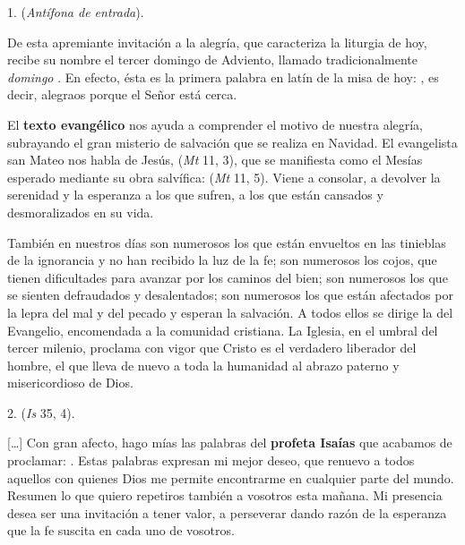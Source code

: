 				\begin{body}
					1.  (\emph{Antífona de entrada}).
					
					De esta apremiante invitación a la alegría, que caracteriza la liturgia de hoy, recibe su nombre el tercer domingo de Adviento, llamado tradicionalmente \emph{domingo }. En efecto, ésta es la primera palabra en latín de la misa de hoy: , es decir, alegraos porque el Señor está cerca.
					
					El \textbf{texto evangélico} nos ayuda a comprender el motivo de nuestra alegría, subrayando el gran misterio de salvación que se realiza en Navidad. El evangelista san Mateo nos habla de Jesús,  (\emph{Mt} 11, 3), que se manifiesta como el Mesías esperado mediante su obra salvífica:  (\emph{Mt} 11, 5). Viene a consolar, a devolver la serenidad y la esperanza a los que sufren, a los que están cansados y desmoralizados en su vida.
					
					También en nuestros días son numerosos los que están envueltos en las tinieblas de la ignorancia y no han recibido la luz de la fe; son numerosos los cojos, que tienen dificultades para avanzar por los caminos del bien; son numerosos los que se sienten defraudados y desalentados; son numerosos los que están afectados por la lepra del mal y del pecado y esperan la salvación. A todos ellos se dirige la  del Evangelio, encomendada a la comunidad cristiana. La Iglesia, en el umbral del tercer milenio, proclama con vigor que Cristo es el verdadero liberador del hombre, el que lleva de nuevo a toda la humanidad al abrazo paterno y misericordioso de Dios.
					
					2.  (\emph{Is} 35, 4).
					
					[\ldots{}] Con gran afecto, hago mías las palabras del \textbf{profeta Isaías} que acabamos de proclamar: . Estas palabras expresan mi mejor deseo, que renuevo a todos aquellos con quienes Dios me permite encontrarme en cualquier parte del mundo. Resumen lo que quiero repetiros también a vosotros esta mañana. Mi presencia desea ser una invitación a tener valor, a perseverar dando razón de la esperanza que la fe suscita en cada uno de vosotros.
					

\end{body}

